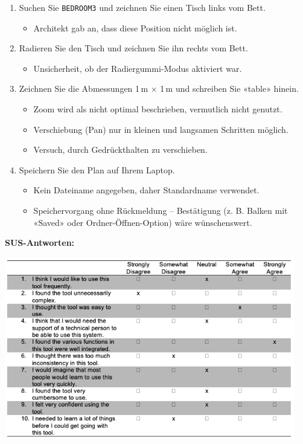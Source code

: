 \begin{enumerate}
    \item Suchen Sie \texttt{BEDROOM3} und zeichnen Sie einen Tisch links vom Bett.
    \begin{itemize}
        \item Architekt gab an, dass diese Position nicht möglich ist.
    \end{itemize}

    \item Radieren Sie den Tisch und zeichnen Sie ihn rechts vom Bett.
    \begin{itemize}
        \item Unsicherheit, ob der Radiergummi-Modus aktiviert war.
    \end{itemize}

    \item Zeichnen Sie die Abmessungen 1\,m $\times$ 1\,m und schreiben Sie «table» hinein.
    \begin{itemize}
        \item Zoom wird als nicht optimal beschrieben, vermutlich nicht genutzt.
        \item Verschiebung (Pan) nur in kleinen und langsamen Schritten möglich.
        \item Versuch, durch Gedrückthalten zu verschieben.
    \end{itemize}

    \item Speichern Sie den Plan auf Ihrem Laptop.
    \begin{itemize}
        \item Kein Dateiname angegeben, daher Standardname verwendet.
        \item Speichervorgang ohne Rückmeldung – Bestätigung (z. B. Balken mit «Saved» oder Ordner-Öffnen-Option) wäre wünschenswert.
    \end{itemize}
\end{enumerate}

\clearpage

\textbf{SUS-Antworten:}
\begin{center}
    \includegraphics[width=0.95\textwidth]{graphics/sus_person1.png}
\end{center}

